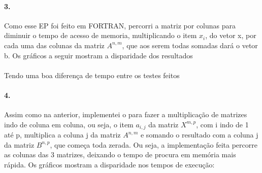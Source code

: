 \documentclass{article}
\begin{document}
	\paragraph{3.}
		Como esse EP foi feito em FORTRAN, percorri a matriz por colunas para diminuir o tempo de acesso de memoria, multiplicando o item $x_{i}$, do vetor x, por cada uma das colunas da matriz $A^{n,m}$, que aos serem todas somadas dará o vetor b.
		Os gráficos a seguir mostram a disparidade dos resultados
	\begin{figure}[h]
		\qquad
	\end{figure}
	
	\paragraph{}
		Tendo uma boa diferença de tempo entre os testes feitos
	
	\paragraph{4.}
		Assim como na anterior, implementei o para fazer a multiplicação de matrizes indo de coluna em coluna, ou seja, o item $a_{i,j}$ da matriz $X^{m,p}$, com i indo de 1 até p, multiplica a coluna j da matriz $A^{n,m}$ e somando o resultado com a coluna j da matriz $B^{n,p}$, que começa toda zerada.
		Ou seja, a implementação feita percorre as colunas das 3 matrizes, deixando o tempo de procura em memória mais rápida.
		Os gráficos mostram a disparidade nos tempos de execução:
		
\end{document}
